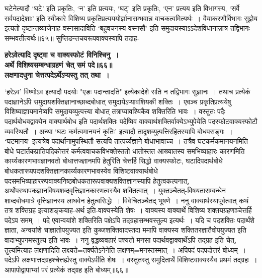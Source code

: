 {{{{ घटेनेत्यादौ `घटे' इति प्रकृतिः, `न' इति प्रत्ययः, `घट्' इति प्रकृतिः, `एन' प्रत्यय इति विभागस्य, `सर्वे सर्वपदादेशाः' इति स्वीकारे विशिष्य प्रकृतिप्रत्यययोर्ज्ञानासम्भवान्न वाचकत्वमित्यर्थः~।
वैयाकरणौर्विभागः सुज्ञेय इत्यतो दृष्टान्तव्याजेनाह-वस्नसादाविति-`बहुवचनस्य वस्नसौ' इति समुदायस्याऽऽदेशविधानान्नात्र तद्विभागः सम्भवतीत्यर्थः॥६५॥
 सुप्तिङन्तचयरूपवाक्यस्यापि तदाह-

\begin{center}{\bfseries हरेऽवेत्यादि दृष्ट्वा च वाक्यस्फोटं विनिश्चिनु~।\\[10pt]

 अर्थे विशिष्यसम्बन्धाग्रहणं चेत् समं पदे॥६६॥\\
 लक्षणादधुना चेत्तत्पदेऽर्थेऽप्यस्तु तत् तथा~।}\end{center}

 `हरेऽव' विष्णोऽव इत्यादौ पदयोः "एङः पदान्तादति" इत्येकादेशे सति न तद्विभागः सुज्ञानः~।
तथाच प्रत्येकं पदाज्ञानेऽपि समुदायशक्तिज्ञानाच्छाब्दबोधात् समुदायेऽप्यावशियकी शक्तिः~।
एवञ्च प्रकृतिप्रत्ययेषु विशिष्याज्ञायमानेष्वपि समुदायव्युत्पत्त्या बोधात् तत्राप्यावश्यिकैव शक्तिरिति भावः~।
वस्तुतः पदैः पदार्थबोधवद्वाक्येन वाक्यार्थबोध इति पदार्थशक्तिः पदेष्विव वाक्यार्थशक्तिर्वाक्येऽभ्युपेयेति पदस्फोटवाक्यस्फोटौ व्यवस्थितौ~।
अन्था `घटः कर्मत्वमानयनं कृतिः' इत्यादौ तादृशब्युत्पत्तिरहितस्यापि बोधपसङ्गः~।
`घटमानय' इत्यत्रेव पदार्थानामुपस्थितौ सत्यपि तात्पर्य्यज्ञाने बोधाभावाच्च~।
तत्रैव घटकर्मकमानयनमिति बोधे घटार्तकप्रातिपदिकोत्तरं कर्मत्ववाचकविभक्तेस्ततो धातोस्तत आख्यातस्य समभिव्याहारः कारणमिति कार्य्यकारणभावज्ञानवतो बोधात्तज्ज्ञानमपि हेतुरिति चेत्तर्हि सिद्धो वाक्यस्फोटः, घटादिपदार्थबोधे बोधकतारूपपदशक्तिज्ञानकार्य्यकारणभावस्येव विशिष्टवाक्यार्थबोधे पदसमभिव्याहाररुपवाक्यनिष्ठबोधकतारूपवाक्यशक्तिज्ञानस्यापि हेतुत्वकल्पनात्, अर्थोपस्थापकज्ञानविषयशब्दवृत्तिज्ञानकारणत्वस्यैव शक्तित्वात्~।
 युक्तञ्चैतत्-विषयतासम्बन्धेन शाब्दबोधमात्रे वृत्तिज्ञानस्य लाघवेन हेतुत्वसिद्धेः~।
विवेचितञ्चैतद् भूषणे~।
 ननु वाक्यार्थस्यापूर्वत्वात् कथं तत्र शक्तिग्रह इत्याशङ्कयाह-अर्थ इति-वाक्यस्येति शेषः~।
वाक्यस्य वाक्यार्थे विशिष्य शक्तयग्रहणञ्चेत्तर्हि पदेऽप समम्~।
पदे एवान्वयांशे शक्तिरिति पक्षेऽपि तद्ग्रहासम्भवस्तुल्य इत्यर्थः~।
यदि च पदशक्तिः पदार्थंशे ज्ञाता, अन्वयांशे चाज्ञातोपयुज्यत इति कुब्जशक्तिवादस्तदा ममापि वाक्यस्य शक्तितरज्ञातैवोपयुज्यत इति वादाभ्युपगमस्तुल्य इति भावः~।
ननु वृद्धव्यवहारं पश्यतो मनसा पदार्थवद्वाक्यार्थेऽपि तद्ग्रह इति चेत्, तुल्यमित्याह-लक्षणादिति-लक्ष्यते=तर्क्यतेऽनेनेति लक्षणम्=मनस्तस्मात्~।
अपिपदं पदपदोत्तरं बोध्यम्~।
पदेऽपि लक्षणात्तदग्रहश्चेत्तर्ह्यस्तु वाक्येऽपीति शेषः~।
वस्तुतस्तु समुदितार्थे विशिष्टवाक्यस्यैव प्रथमं तद्ग्रहः~।
आपापोद्वापाभ्यां परं प्रत्येकं तद्ग्रह इति बोध्यम्॥६६॥

}}}}
